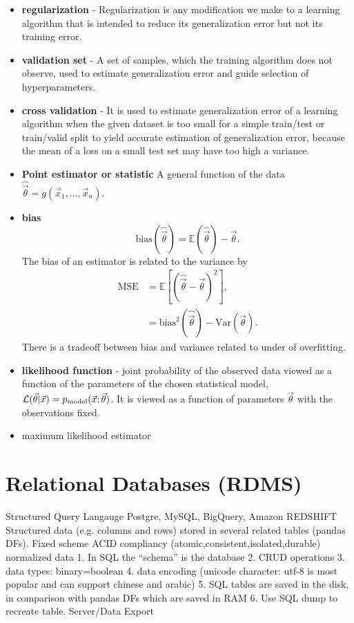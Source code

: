 \documentclass[11pt, oneside]{article}   	%
\begin{document}
\begin{itemize}
\item  \textbf{regularization} - Regularization is any modiﬁcation we make to a
learning algorithm that is intended to reduce its generalization error but not its
training error.
\item \textbf{validation set} - A set
of samples, which the training
algorithm does not observe, used to estimate generalization error and guide selection of hyperparameters.
\item \textbf{cross validation} - It is used to estimate generalization error of a learning algorithm when the given dataset is too
small for a simple train/test or train/valid split to yield accurate estimation of
generalization error, because the mean of a loss
on a small test set may have too
high a variance. 
\item \textbf{Point estimator or statistic} A general function of the data $\hat{\vec\theta} = g(\vec x_{1}, \ldots , \vec x_{n})$.
\item \textbf{bias} 
\begin{equation}
\mathrm{bias}(\hat{\vec{\theta}}) = \mathbb{E}(\hat{\vec{\theta}}) - \vec\theta.
\end{equation}
The bias of an estimator is related to the variance by
\begin{align}
\mathrm{MSE} &= \mathbb{E}[(\hat{\vec\theta}-\vec\theta)^{2}], \\
		     &= \mathrm{bias}^{2}(\hat{\vec\theta}) -\mathrm{Var}(\vec\theta).
\end{align}
There is a tradeoff between bias and variance related to under of overfitting.

\item \textbf{likelihood function} - joint probability of the observed data viewed as a function of the parameters of the chosen statistical model, $\mathcal L(\vec \theta \vert \vec x) = p_{\rm model}(\vec x; \vec \theta)$. It is viewed as a function of parameters $\vec\theta$ with the observations fixed.
\item maximum likelihood estimator
\end{itemize}




\section{Relational Databases (RDMS)}
Structured Query Langauge
Postgre, MySQL, BigQuery, Amazon REDSHIFT
Structured data (e.g. columns and rows) stored in several related tables (pandas DFs).
Fixed scheme
ACID compliancy (atomic,consistent,isolated,durable) normalized data
1. In SQL the “schema” is the database
2. CRUD operations
3. data types: binary=boolean
4. data encoding (unicode character: utf-8 is most popular and can support chinese and arabic)
5. SQL tables are saved in the disk, in comparison with pandas DFs which are saved in RAM
6. Use SQL dump to recreate table. Server/Data Export
\end{document}

